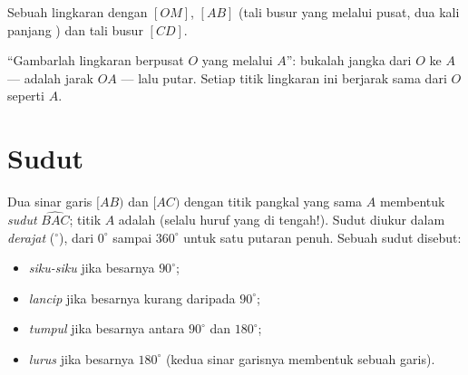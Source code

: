 \begin{omfigure}

{\small Sebuah lingkaran dengan  $[OM]$,  $[AB]$
(tali busur yang melalui pusat, dua kali panjang ) dan tali busur $[CD]$.}
\end{omfigure}

\begin{example}\label{ex:g6:lines:circle}
``Gambarlah lingkaran berpusat $O$ yang melalui $A$'': bukalah jangka
dari $O$ ke $A$ ---  adalah jarak $OA$ --- lalu putar.
Setiap titik lingkaran ini berjarak sama dari $O$ seperti $A$.
\end{example}

\section{Sudut}

\begin{definition}[Sudut]\label{def:g6:lines:angle}
Dua sinar garis $[AB)$ dan $[AC)$ dengan titik pangkal yang sama $A$
membentuk \emph{sudut} $\widehat{BAC}$; titik $A$ adalah
\emph{} (selalu huruf yang di tengah!). Sudut diukur
dalam \emph{derajat} ($^\circ$), dari $0^\circ$ sampai $360^\circ$
untuk satu putaran penuh. Sebuah sudut disebut:
\begin{itemize}
  \item \emph{siku-siku} jika besarnya $90^\circ$;
  \item \emph{lancip} jika besarnya kurang daripada $90^\circ$;
  \item \emph{tumpul} jika besarnya antara $90^\circ$ dan
        $180^\circ$;
  \item \emph{lurus} jika besarnya $180^\circ$ (kedua sinar garisnya
        membentuk sebuah garis).
\end{itemize}
\end{definition}

